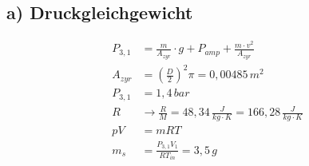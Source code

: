 \subsection*{a) Druckgleichgewicht}

\begin{align*}
P_{3,1} &= \frac{m}{A_{zyr}} \cdot g + P_{amp} + \frac{m \cdot v^2}{A_{zyr}} \\
A_{zyr} &= \left(\frac{D}{2}\right)^2 \pi = 0,00485 \, m^2 \\
P_{3,1} &= 1,4 \, bar \\
R &\rightarrow \frac{R}{M} = 48,34 \, \frac{J}{kg \cdot K} = 166,28 \, \frac{J}{kg \cdot K} \\
pV &= mRT \\
m_s &= \frac{P_{3,1} V_1}{R T_{in}} = 3,5 \, g
\end{align*}